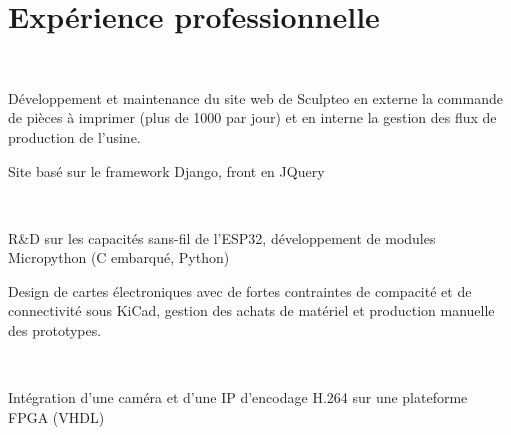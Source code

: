 \documentclass[]{cv-template}
\begin{document}
\hfill
\begin{minipage}[t]{0.65\textwidth}

\section{Expérience professionnelle}
\\
    \vspace{0.9em} %
\begin{tightemize}
\item Développement et maintenance du site web de Sculpteo en externe la commande de pièces à imprimer (plus de 1000 par jour) et en interne la gestion des flux de production de l'usine.
\item Site basé sur le framework Django, front en JQuery
\end{tightemize}
\sectionsep

\\
\begin{tightemize}
\item R\&D sur les capacités sans-fil de l'ESP32, développement de modules Micropython (C embarqué, Python)
\item Design de cartes électroniques avec de fortes contraintes de compacité et de connectivité sous KiCad, gestion des achats de matériel et production manuelle des prototypes.
\end{tightemize}
\sectionsep

\\
\begin{tightemize}
\item Intégration d'une caméra et d'une IP d'encodage H.264 sur une plateforme FPGA (VHDL)
\end{tightemize}
\sectionsep



\end{minipage}
\end{document}

